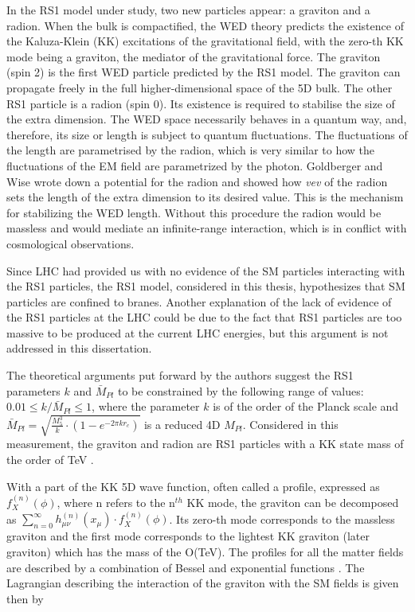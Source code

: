 In the RS1 model under study, two new particles appear: a graviton and a radion. When the bulk is compactified, the WED theory predicts the existence of the Kaluza-Klein (KK) \cite{Uzawa:1999pg} excitations of the gravitational field, with the zero-th KK mode being a graviton, the mediator of the gravitational force. The graviton (spin 2) is the first WED particle predicted by the RS1 model. The graviton can propagate freely in the full higher-dimensional space of the 5D bulk. The other RS1 particle is a radion (spin 0). Its existence is required to stabilise the size of the extra dimension. The WED space necessarily behaves in a quantum way, and, therefore, its size or length is subject to quantum fluctuations. The fluctuations of the length are parametrised by the radion, which is very similar to how the fluctuations of the EM field are parametrized by the photon. Goldberger and Wise \cite{Goldberger:1999uk} wrote down a potential for the radion and showed how \textit{vev} of the radion sets the length of the extra dimension to its desired value. This is the mechanism for stabilizing the WED length. Without this procedure the radion would be massless and would mediate an infinite-range interaction, which is in conflict with cosmological observations. 


Since LHC had provided us with no evidence of the SM particles interacting with the RS1 particles, the RS1 model, considered in this thesis, hypothesizes that SM particles are confined to branes. Another explanation of the lack of evidence of the RS1 particles at the LHC could be due to the fact that RS1 particles are too massive to be produced at the current LHC energies, but this argument is not addressed in this dissertation. 


The theoretical arguments put forward by the authors \cite{Davoudiasl:1999jd} suggest the RS1 parameters $k$ and $\bar{M}_{Pl}$ to be constrained by the following range of values: $0.01 \leq k / \bar{M}_{Pl} \leq 1$, where the parameter $k$ is of the order of the Planck scale and $\bar{M}_{Pl} = \sqrt{\frac{M^3_5}{k} \cdot (1 - e^{-2\pi k r_c} ) }$ is a reduced 4D $M_{Pl}$. Considered in this measurement, the graviton and radion are RS1 particles with a KK state mass of the order of TeV \cite{Oliveira:2014kla}. 

With a part of the KK 5D wave function, often called a profile, expressed as $f^{(n)}_X(\phi)$, where n refers to the n$^{th}$ KK mode, the graviton can be decomposed as $\sum_{n=0}^{\infty} h^{(n)}_{\mu\nu}(x_\mu) \cdot f^{(n)}_X(\phi)$. Its zero-th mode corresponds to the massless graviton and the first mode corresponds to the lightest KK graviton (later graviton) which has the mass of the O(TeV). The profiles for all the matter fields are described by a combination of Bessel and exponential functions \cite{Traczyk:2002jh, Goldberger:1999wh,Raychaudhuri:2126967}. The Lagrangian describing the interaction of the graviton with the SM fields is given then by 

